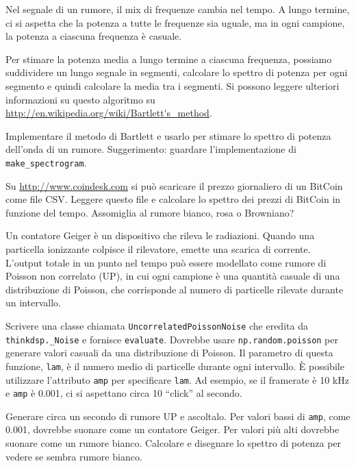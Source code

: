 \documentclass[12pt,a4paper]{book}
\begin{document}
\begin{exercise} Nel segnale di un rumore, il mix di frequenze cambia nel tempo. A lungo termine, ci si aspetta che la potenza a tutte le frequenze sia uguale, ma in ogni campione, la potenza a ciascuna frequenza è casuale.

Per stimare la potenza media a lungo termine a ciascuna frequenza, possiamo suddividere un lungo segnale in segmenti, calcolare lo spettro di potenza per ogni segmento e quindi calcolare la media tra i segmenti. Si possono leggere ulteriori informazioni su questo algoritmo su \url{http://en.wikipedia.org/wiki/Bartlett's_method}.

Implementare il metodo di Bartlett e usarlo per stimare lo spettro di potenza dell'onda di un rumore. Suggerimento: guardare l'implementazione di \verb"make_spectrogram". \end{exercise} 

\begin{exercise} Su \url{http://www.coindesk.com} si può scaricare il prezzo giornaliero di un BitCoin come file CSV. Leggere questo file e calcolare lo spettro dei prezzi di BitCoin in funzione del tempo. Assomiglia al rumore bianco, rosa o Browniano? \end{exercise} 

\begin{exercise} Un contatore Geiger è un dispositivo che rileva le radiazioni. Quando una particella ionizzante colpisce il rilevatore, emette una scarica di corrente. L'output totale in un punto nel tempo può essere modellato come rumore di Poisson non correlato (UP), in cui ogni campione è una quantità casuale di una distribuzione di Poisson, che corrisponde al numero di particelle rilevate durante un intervallo.

Scrivere una classe chiamata {\tt UncorrelatedPoissonNoise} che eredita da \verb"thinkdsp._Noise" e fornisce {\tt evaluate}. Dovrebbe usare {\tt np.random.poisson} per generare valori casuali da una distribuzione di Poisson. Il parametro di questa funzione, {\tt lam}, è il numero medio di particelle durante ogni intervallo. È possibile utilizzare l'attributo {\tt amp} per specificare {\tt lam}. Ad esempio, se il framerate è 10 kHz e {\tt amp} è 0.001, ci si aspettano circa 10 ``click'' al secondo.

Generare circa un secondo di rumore UP e ascoltalo. Per valori bassi di {\tt amp}, come 0.001, dovrebbe suonare come un contatore Geiger. Per valori più alti dovrebbe suonare come un rumore bianco. Calcolare e disegnare lo spettro di potenza per vedere se sembra rumore bianco. \end{exercise} 
\end{document}
